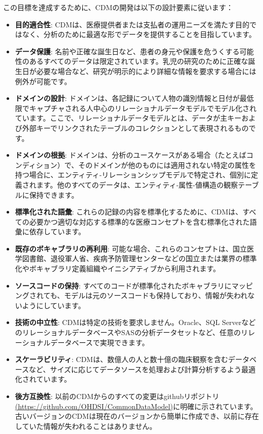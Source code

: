 \documentclass[
  11pt]{book}
\providecommand{\tightlist}{%
  \setlength{\itemsep}{0pt}\setlength{\parskip}{0pt}}
\theoremstyle{definition}
\theoremstyle{definition}
\theoremstyle{definition}
\theoremstyle{definition}
\theoremstyle{remark}
\begin{document}
この目標を達成するために、CDMの開発は以下の設計要素に従います：

\begin{itemize}
\tightlist
\item
  \textbf{目的適合性}: CDMは、医療提供者または支払者の運用ニーズを満たす目的ではなく、分析のために最適な形でデータを提供することを目指しています。 
\item
  \textbf{データ保護}: 名前や正確な誕生日など、患者の身元や保護を危うくする可能性のあるすべてのデータは限定されています。乳児の研究のために正確な誕生日が必要な場合など、研究が明示的により詳細な情報を要求する場合には例外が可能です。 
\item
  \textbf{ドメインの設計}: ドメインは、各記録について人物の識別情報と日付が最低限でキャプチャされる人中心のリレーショナルデータモデルでモデル化されています。ここで、リレーショナルデータモデルとは、データが主キーおよび外部キーでリンクされたテーブルのコレクションとして表現されるものです。
\item
  \textbf{ドメインの根拠}: ドメインは、分析のユースケースがある場合（たとえばコンディション）で、そのドメインが他のものには適用されない特定の属性を持つ場合に、エンティティ-リレーションシップモデルで特定され、個別に定義されます。他のすべてのデータは、エンティティ-属性-値構造の観察テーブルに保持できます。 
\item
  \textbf{標準化された語彙}: これらの記録の内容を標準化するために、CDMは、すべての必要かつ適切な対応する標準的な医療コンセプトを含む標準化された語彙に依存しています。
\item
  \textbf{既存のボキャブラリの再利用}: 可能な場合、これらのコンセプトは、国立医学図書館、退役軍人省、疾病予防管理センターなどの国立または業界の標準化やボキャブラリ定義組織やイニシアティブから利用されます。
\item
  \textbf{ソースコードの保持}: すべてのコードが標準化されたボキャブラリにマッピングされても、モデルは元のソースコードも保持しており、情報が失われないようにしています。  
\item
  \textbf{技術の中立性}: CDMは特定の技術を要求しません。Oracle、SQL ServerなどのリレーショナルデータベースやSASの分析データセットなど、任意のリレーショナルデータベースで実現できます。 
\item
  \textbf{スケーラビリティ}: CDMは、数億人の人と数十億の臨床観察を含むデータベースなど、サイズに応じてデータソースを処理および計算分析するよう最適化されています。 
\item
  \textbf{後方互換性}: 以前のCDMからのすべての変更はgithubリポジトリ\href{https://github.com/OHDSI/CommonDataModel}{(https://github.com/OHDSI/CommonDataModel)}に明確に示されています。古いバージョンのCDMは現在のバージョンから簡単に作成でき、以前に存在していた情報が失われることはありません。 
\end{itemize}
\end{document}

